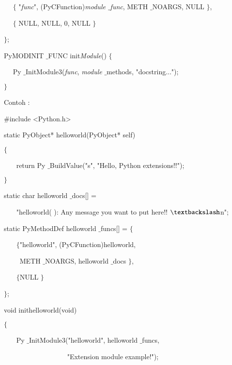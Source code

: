 \documentclass[a4paper,12pt]{report}
\begin{document}
\noindent 
~~  $  \{  $ "\textit{func}", (PyCFunction)\textit{module $  \_  $func}, METH $  \_  $NOARGS, NULL  $  \}  $, \par
\noindent 
~~  $  \{  $ NULL, NULL, 0, NULL  $  \}  $ \par
\noindent 
 $  \}  $; \par
\vspace{12pt}
\noindent 
PyMODINIT $  \_  $FUNC init\textit{Module}()  $  \{  $ \par
\noindent 
~~ Py $  \_  $InitModule3(\textit{func}, \textit{module} $  \_  $methods, "docstring..."); \par
\noindent 
 $  \}  $ \par
\vspace{12pt}
\vspace{12pt}
\noindent 
Contoh : \par
\noindent 
 $  \#  $include <Python.h> \par
\vspace{12pt}
\noindent 
static PyObject* helloworld(PyObject* self) \par
\noindent 
 $  \{  $ \par
\noindent 
~~~ return Py $  \_  $BuildValue("s", "Hello, Python extensions!!"); \par
\noindent 
 $  \}  $ \par
\vspace{12pt}
\noindent 
static char helloworld $  \_  $docs[] = \par
\noindent 
~~~ "helloworld( ): Any message you want to put here!! $  \textbackslash  $n"; \par
\vspace{12pt}
\noindent 
static PyMethodDef helloworld $  \_  $funcs[] =  $  \{  $ \par
\noindent 
~~~  $  \{  $"helloworld", (PyCFunction)helloworld,  \par
\noindent 
~~~~ METH $  \_  $NOARGS, helloworld $  \_  $docs $  \}  $, \par
\noindent 
~~~  $  \{  $NULL $  \}  $ \par
\noindent 
 $  \}  $; \par
\vspace{12pt}
\noindent 
void inithelloworld(void) \par
\noindent 
 $  \{  $ \par
\noindent 
~~~ Py $  \_  $InitModule3("helloworld", helloworld $  \_  $funcs, \par
\noindent 
~~~~~~~~~~~~~~~~~~ "Extension module example!"); \par
\end{document}

